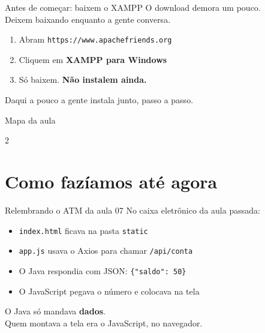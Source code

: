 \documentclass[aspectratio=169,11pt]{beamer}
\begin{document}
\begin{frame}{Antes de começar: baixem o XAMPP}
  O download demora um pouco.\\
  Deixem baixando enquanto a gente conversa.

  \vspace{0.6em}
  \begin{enumerate}
    \item Abram \texttt{https://www.apachefriends.org}
    \item Cliquem em \textbf{XAMPP para Windows}
    \item Só baixem. \textbf{Não instalem ainda.}
  \end{enumerate}

  \vspace{0.6em}
  Daqui a pouco a gente instala junto, passo a passo.
\end{frame}

\begin{frame}{Mapa da aula}
  \begin{multicols}{2}
    \small
    \tableofcontents
  \end{multicols}
\end{frame}

\section{Como fazíamos até agora}

\begin{frame}{Relembrando o ATM da aula 07}
  No caixa eletrônico da aula passada:

  \vspace{0.5em}
  \begin{itemize}
    \item \texttt{index.html} ficava na pasta \texttt{static}
    \item \texttt{app.js} usava o Axios para chamar \texttt{/api/conta}
    \item O Java respondia com JSON: \texttt{\{"saldo": 50\}}
    \item O JavaScript pegava o número e colocava na tela
  \end{itemize}

  \vspace{0.5em}
  O Java só mandava \textbf{dados}.\\
  Quem montava a tela era o JavaScript, no navegador.
\end{frame}
\end{document}
